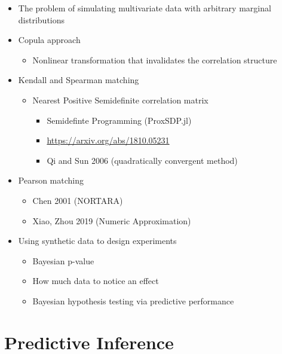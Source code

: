 \documentclass[
]{report}
\providecommand{\tightlist}{%
  \setlength{\itemsep}{0pt}\setlength{\parskip}{0pt}}
\begin{document}
\begin{itemize}
\tightlist
\item
  The problem of simulating multivariate data with arbitrary marginal distributions
\item
  Copula approach

  \begin{itemize}
  \tightlist
  \item
    Nonlinear transformation that invalidates the correlation structure
  \end{itemize}
\item
  Kendall and Spearman matching

  \begin{itemize}
  \tightlist
  \item
    Nearest Positive Semidefinite correlation matrix

    \begin{itemize}
    \tightlist
    \item
      Semidefinte Programming (ProxSDP.jl)
    \item
      \url{https://arxiv.org/abs/1810.05231}
    \item
      Qi and Sun 2006 (quadratically convergent method)
    \end{itemize}
  \end{itemize}
\item
  Pearson matching

  \begin{itemize}
  \tightlist
  \item
    Chen 2001 (NORTARA)
  \item
    Xiao, Zhou 2019 (Numeric Approximation)
  \end{itemize}
\item
  Using synthetic data to design experiments

  \begin{itemize}
  \tightlist
  \item
    Bayesian p-value
  \item
    How much data to notice an effect
  \item
    Bayesian hypothesis testing via predictive performance
  \end{itemize}
\end{itemize}

\hypertarget{predictive-inference}{%
\chapter{Predictive Inference}\label{predictive-inference}}
\end{document}
